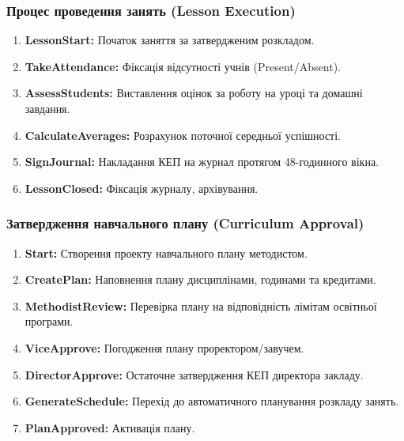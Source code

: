 \documentclass{article}
\begin{document}
\subsubsection{Процес проведення занять (Lesson Execution)}
\begin{enumerate}
    \item \textbf{LessonStart:} Початок заняття за затвердженим розкладом.
    \item \textbf{TakeAttendance:} Фіксація відсутності учнів (Present/Absent).
    \item \textbf{AssessStudents:} Виставлення оцінок за роботу на уроці та домашні завдання.
    \item \textbf{CalculateAverages:} Розрахунок поточної середньої успішності.
    \item \textbf{SignJournal:} Накладання КЕП на журнал протягом 48-годинного вікна.
    \item \textbf{LessonClosed:} Фіксація журналу, архівування.
\end{enumerate}

\subsubsection{Затвердження навчального плану (Curriculum Approval)}
\begin{enumerate}
    \item \textbf{Start:} Створення проекту навчального плану методистом.
    \item \textbf{CreatePlan:} Наповнення плану дисциплінами, годинами та кредитами.
    \item \textbf{MethodistReview:} Перевірка плану на відповідність лімітам освітньої програми.
    \item \textbf{ViceApprove:} Погодження плану проректором/завучем.
    \item \textbf{DirectorApprove:} Остаточне затвердження КЕП директора закладу.
    \item \textbf{GenerateSchedule:} Перехід до автоматичного планування розкладу занять.
    \item \textbf{PlanApproved:} Активація плану.
\end{enumerate}
\end{document}
